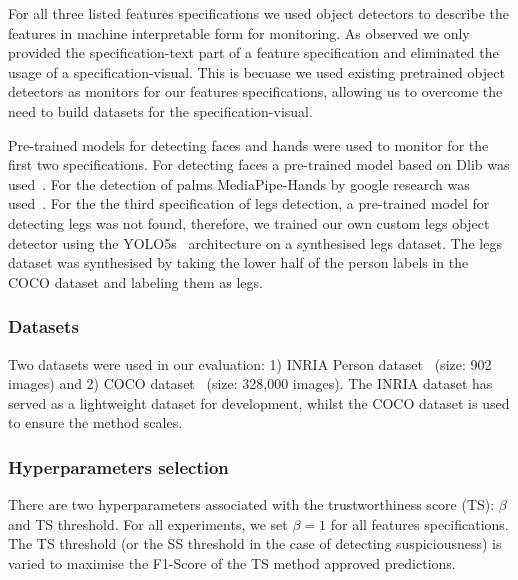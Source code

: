 For all three listed features specifications we used object detectors to describe the features in machine interpretable form for monitoring. 
%
As observed we only provided the specification-text part of a feature specification and eliminated the usage of a specification-visual. 
%
This is becuase we used existing pretrained object detectors as monitors for our features specifications, allowing us to overcome the need to build datasets for the specification-visual.  

Pre-trained models for detecting faces and hands were used to monitor for the first two specifications. 
%
For detecting faces a pre-trained model based on Dlib was used~\cite{king2015}.
For the detection of palms MediaPipe-Hands by google research was used~\cite{mediapipe}.
%
For the the third specification of legs detection, a pre-trained model for detecting legs was not found, therefore, we trained our own custom legs object detector using the YOLO5s~\cite{Jocher_YOLOv5_by_Ultralytics_2020} architecture on a synthesised legs dataset. The legs dataset was synthesised by taking the lower half of the person labels in the COCO dataset and labeling them as legs.
%
\subsubsection{Datasets}
Two datasets were used in our evaluation: 1) INRIA Person dataset~\cite{Dalal2005} (size: 902 images) and 2) COCO dataset~\cite{COCO_dataset} (size: 328,000 images). 
%
The INRIA dataset has served as a lightweight dataset for development, whilst the COCO dataset is used to ensure the method scales.%

\subsubsection{Hyperparameters selection}
There are two hyperparameters associated with the trustworthiness score (TS): $\beta$ and TS threshold. For all experiments, we set $\beta = 1$ for all features specifications. The TS threshold (or the SS threshold in the case of detecting suspiciousness) is varied to maximise the F1-Score of the TS method approved predictions.

